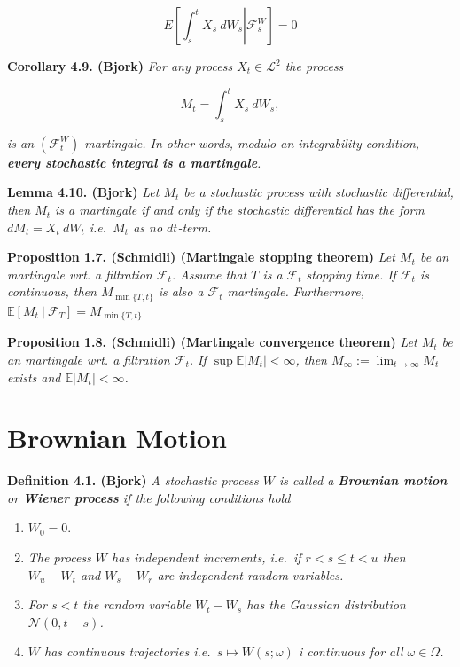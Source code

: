 \documentclass[a4paper,10pt,openany]{book}
\providecommand{\tightlist}{%
 \setlength{\itemsep}{0pt}\setlength{\parskip}{0pt}}
\begin{document}
\[
E\left[\left.\int_s^t X_s\ dW_s\right\vert\mathcal{F}_s^W\right]=0
\]

\textbf{Corollary 4.9. (Bjork)} \emph{For any process \(X_t\in\mathcal{L}^2\) the process}

\[
M_t=\int_s^t X_s\ dW_s,
\]

\emph{is an \((\mathcal{F}_t^W)\)-martingale. In other words, modulo an integrability condition, \textbf{every stochastic integral is a martingale}.}

\textbf{Lemma 4.10. (Bjork)} \emph{Let \(M_t\) be a stochastic process with stochastic differential, then \(M_t\) is a martingale if and only if the stochastic differential has the form \(dM_t=X_t\ dW_t\) i.e.~\(M_t\) as no \(dt\)-term.}

\textbf{Proposition 1.7. (Schmidli) (Martingale stopping theorem)} \emph{Let \(M_t\) be an martingale wrt. a filtration \(\mathcal F_t\). Assume that \(T\) is a \(\mathcal F_t\) stopping time. If \(\mathcal F_t\) is continuous, then \(M_{\min\{T,t\}}\) is also a \(\mathcal F_t\) martingale. Furthermore, \(\mathbb E[M_t\ \vert\ \mathcal F_T]=M_{\min\{T,t\}}\)}

\textbf{Proposition 1.8. (Schmidli) (Martingale convergence theorem)} \emph{Let \(M_t\) be an martingale wrt. a filtration \(\mathcal F_t\). If \(\sup\mathbb E\vert M_t\vert <\infty\), then \(M_\infty:=\lim_{t\to\infty} M_t\) exists and \(\mathbb E\vert M_t\vert<\infty\).}

\hypertarget{brownian-motion}{%
\section{Brownian Motion}\label{brownian-motion}}

\textbf{Definition 4.1. (Bjork)} \emph{A stochastic process \(W\) is called a \textbf{Brownian motion} or \textbf{Wiener process} if the following conditions hold}

\begin{enumerate}
\def\labelenumi{\arabic{enumi}.}
\tightlist
\item
  \(W_0=0\).
\item
  \emph{The process \(W\) has independent increments, i.e.~if \(r<s\le t< u\) then \(W_u-W_t\) and \(W_s-W_r\) are independent random variables.}
\item
  \emph{For \(s<t\) the random variable \(W_t-W_s\) has the Gaussian distribution \(\mathcal{N}(0,t-s)\).}
\item
  \emph{\(W\) has continuous trajectories i.e.~\(s\mapsto W(s;\omega)\) i continuous for all \(\omega \in\Omega\).}
\end{enumerate}
\end{document}
